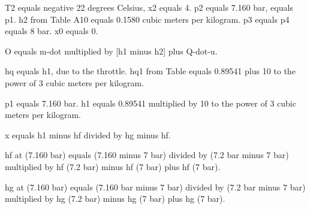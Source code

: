 T2 equals negative 22 degrees Celsius, x2 equals 4.  
p2 equals 7.160 bar, equals p1.  
h2 from Table A10 equals 0.1580 cubic meters per kilogram.  
p3 equals p4 equals 8 bar.  
x0 equals 0.  

O equals m-dot multiplied by [h1 minus h2] plus Q-dot-u.  

hq equals h1, due to the throttle.  
hq1 from Table equals 0.89541 plus 10 to the power of 3 cubic meters per kilogram.  

p1 equals 7.160 bar.  
h1 equals 0.89541 multiplied by 10 to the power of 3 cubic meters per kilogram.  

x equals h1 minus hf divided by hg minus hf.  

hf at (7.160 bar) equals (7.160 minus 7 bar) divided by (7.2 bar minus 7 bar) multiplied by hf (7.2 bar) minus hf (7 bar) plus hf (7 bar).  

hg at (7.160 bar) equals (7.160 bar minus 7 bar) divided by (7.2 bar minus 7 bar) multiplied by hg (7.2 bar) minus hg (7 bar) plus hg (7 bar).
